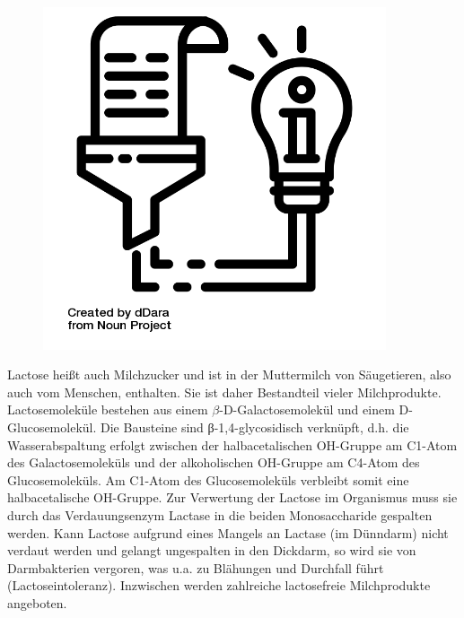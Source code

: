 \documentclass{scrartcl}  %
\begin{document}
\vspace{0.3cm}
			\begin{tcolorbox}[enhanced,
				colback=white,
				colframe=darkgray,
				fonttitle=\sffamily\bfseries\large, 
				title=Lactose,  %
				attach boxed title to top left={xshift=3.2mm,yshift=-0.50mm},
				boxed title style={skin=enhancedfirst jigsaw,size=small,arc=1mm,bottom=-1mm,colframe=darkgray,height=0.75cm},
				colbacktitle=darkgray,
				drop lifted shadow]
				\begin{figure}  
					\centering
					\vspace{-14pt}  %
					\includegraphics[width=0.9\textwidth]{symbols/symbol_tex_content}
				\end{figure}
				
				Lactose heißt auch Milchzucker und ist in der Muttermilch von Säugetieren, also auch vom Menschen, enthalten. Sie ist daher Bestandteil vieler Milchprodukte. Lactosemoleküle bestehen aus einem $\beta$-D-Galactosemolekül und einem D-Glucosemolekül. Die Bausteine sind β-1,4-glycosidisch verknüpft, d.h. die Wasserabspaltung erfolgt zwischen der halbacetalischen OH-Gruppe am C1-Atom des Galactosemoleküls und der alkoholischen OH-Gruppe am C4-Atom des Glucosemoleküls. Am C1-Atom des Glucosemoleküls verbleibt somit eine halbacetalische OH-Gruppe. 
				Zur Verwertung der Lactose im Organismus muss sie durch das Verdauungsenzym Lactase in die beiden Monosaccharide gespalten werden. Kann Lactose aufgrund eines Mangels an Lactase (im Dünndarm) nicht verdaut werden und gelangt ungespalten in den Dickdarm, so wird sie von Darmbakterien vergoren, was u.a. zu Blähungen und Durchfall führt (Lactoseintoleranz). Inzwischen werden zahlreiche lactosefreie Milchprodukte angeboten.
				
			\end{tcolorbox}		
			
\end{document}
